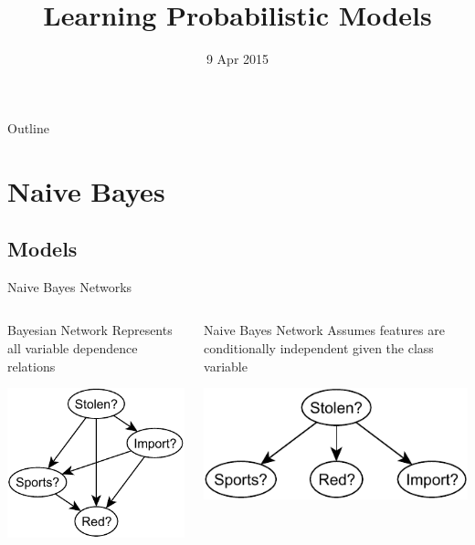 \documentclass[14pt]{beamer}
\title{Learning Probabilistic Models}
\date[]{9 Apr 2015}
\begin{document}
\begin{frame}
\titlepage
\end{frame}

\begin{frame}{Outline}
\tableofcontents
\end{frame}

\section{Naive Bayes}

\subsection{Models}

\begin{frame}{Naive Bayes Networks}
\begin{columns}[t]
\begin{column}{2in}
\begin{block}{Bayesian Network}
Represents all variable dependence relations
\end{block}
\begin{center}
\includegraphics[scale=.75]{stolen-bayes-net}
\end{center}
\end{column}
\pause
\begin{column}{2in}
\begin{block}{Naive Bayes Network}
Assumes features are conditionally independent given the class variable
\end{block}
\begin{center}
\includegraphics[scale=.75]{stolen-naive-bayes}
\end{center}
\end{column}
\end{columns}
\end{frame}
\end{document}
